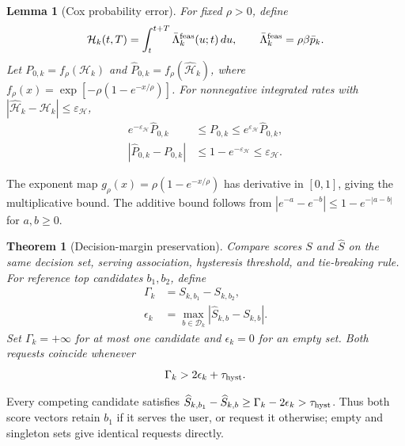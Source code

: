 \documentclass[10pt,letterpaper,journal]{IEEEtran}
\newtheorem{theorem}{Theorem}
\newtheorem{lemma}{Lemma}
\begin{document}
\begin{lemma}[Cox probability error]
\label{lem:cox_risk_calibration}
For fixed $\rho>0$, define
\begin{equation}
\mathcal H_k(t,T)=\int_t^{t+T}\bar\Lambda_k^{\rm feas}(u;t)\,du,
\qquad \bar\Lambda_k^{\rm feas}=\rho\beta\bar p_k.
\label{eq:true_integrated_hazard}
\end{equation}
Let $P_{0,k}=f_\rho(\mathcal H_k)$ and $\widehat P_{0,k}=f_\rho(\widehat{\mathcal H}_k)$, where $f_\rho(x)=\exp[-\rho(1-e^{-x/\rho})]$. For nonnegative integrated rates with $|\widehat{\mathcal H}_k-\mathcal H_k|\le\varepsilon_{\mathcal H}$,
\begin{align}
e^{-\varepsilon_{\mathcal H}}\widehat P_{0,k}
&\le P_{0,k}\le e^{\varepsilon_{\mathcal H}}\widehat P_{0,k},
\label{eq:risk_multiplicative_envelope}\\
|\widehat P_{0,k}-P_{0,k}|
&\le1-e^{-\varepsilon_{\mathcal H}}\le\varepsilon_{\mathcal H}.
\label{eq:risk_additive_error}
\end{align}
\end{lemma}
\begin{IEEEproof}
The exponent map $g_\rho(x)=\rho(1-e^{-x/\rho})$ has derivative in $[0,1]$, giving the multiplicative bound. The additive bound follows from $|e^{-a}-e^{-b}|\le1-e^{-|a-b|}$ for $a,b\ge0$.
\end{IEEEproof}

\begin{theorem}[Decision-margin preservation]
\label{thm:decision_margin_preservation}
Compare scores $S$ and $\widehat S$ on the same decision set, serving association, hysteresis threshold, and tie-breaking rule. For reference top candidates $b_1,b_2$, define
\begin{align}
\Gamma_k&=S_{k,b_1}-S_{k,b_2},\label{eq:score_margin}\\
\epsilon_k&=\max_{b\in\mathcal D_k}|\widehat S_{k,b}-S_{k,b}|.
\label{eq:score_perturbation}
\end{align}
Set $\Gamma_k=+\infty$ for at most one candidate and $\epsilon_k=0$ for an empty set. Both requests coincide whenever
\begin{equation}
\Gamma_k>2\epsilon_k+\tau_{\rm hyst}.
\label{eq:decision_margin_preservation}
\end{equation}
\end{theorem}
\begin{IEEEproof}
Every competing candidate satisfies $\widehat S_{k,b_1}-\widehat S_{k,b}\ge\Gamma_k-2\epsilon_k>\tau_{\rm hyst}$. Thus both score vectors retain $b_1$ if it serves the user, or request it otherwise; empty and singleton sets give identical requests directly.
\end{IEEEproof}
\end{document}
